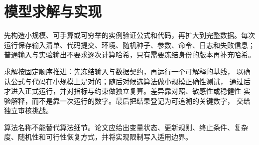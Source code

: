 \section{模型求解与实现}

先构造小规模、可手算或可穷举的实例验证公式和代码，再扩大到完整数据。每次运行保存输入清单、代码提交、环境、随机种子、参数、命令、日志和失败信息；普通输入与实验输出不要求逐次计算哈希，只有需要冻结身份的版本再补充哈希。

求解按固定顺序推进：先冻结输入与数据契约，再运行一个可解释的基线，
以确认公式与代码在小规模上是对的；随后对候选算法做小规模正确性测试，
通过后才进入正式运行，并对指标与约束做独立复算。差异靠对照、敏感性或稳健性
实验解释，而不是靠一次运行的数字。最后把结果登记为可追溯的关键数字，
交给独立审核挑战。

算法名称不能替代算法细节。论文应给出变量状态、更新规则、终止条件、复杂度、随机性和可行性恢复方式，并将实现限制写入适用边界。
